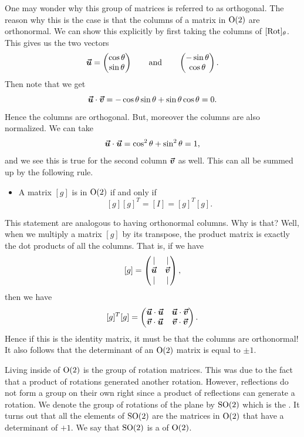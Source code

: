             One may wonder why this group of matrices is referred to as orthogonal.  The reason why this is the case is that the columns of a matrix in $\mathrm{O}(2)$ are orthonormal.  We can show this explicitly by first taking the columns of $[\mathrm{Rot}]_{\theta}$. This gives us the two vectors
            \[
            \boldsymbol{\boldsymbol{\vec{u}}} = \begin{pmatrix} \cos \theta \\ \sin \theta \end{pmatrix} \qquad \textrm{and} \qquad \begin{pmatrix} -\sin \theta \\ \cos \theta \end{pmatrix}.
            \]
            Then note that we get
            \[
            \boldsymbol{\boldsymbol{\vec{u}}} \cdot \boldsymbol{\boldsymbol{\vec{v}}} = -\cos \theta \sin \theta + \sin \theta \cos \theta = 0.
            \]
            Hence the columns are orthogonal.  But, moreover the columns are also normalized. We can take
            \[
            \boldsymbol{\boldsymbol{\vec{u}}} \cdot \boldsymbol{\boldsymbol{\vec{u}}} = \cos^2\theta + \sin^2\theta = 1,
            \]
            and we see this is true for the second column $\boldsymbol{\boldsymbol{\vec{v}}}$ as well.  This can all be summed up by the following rule.
            \begin{itemize}
                \item A matrix $[g]$ is in $\mathrm{O}(2)$ if and only if
                \[
                [g][g]^{T} = [I]=[g]^T [g].
                \]
            \end{itemize}
            This statement are analogous to having orthonormal columns. Why is that? Well, when we multiply a matrix $[g]$ by its transpose, the product matrix is exactly the dot products of all the columns. That is, if we have
            \[
            [g] = \begin{pmatrix} \vert & \vert \\ \boldsymbol{\boldsymbol{\vec{u}}} & \boldsymbol{\boldsymbol{\vec{v}}} \\ \vert & \vert \end{pmatrix},
            \]
            then we have
            \[
            [g]^T[g] = \begin{pmatrix} \boldsymbol{\boldsymbol{\vec{u}}} \cdot \boldsymbol{\boldsymbol{\vec{u}}} & \boldsymbol{\boldsymbol{\vec{u}}} \cdot \boldsymbol{\boldsymbol{\vec{v}}} \\ \boldsymbol{\boldsymbol{\vec{v}}} \cdot \boldsymbol{\boldsymbol{\vec{u}}} & \boldsymbol{\boldsymbol{\vec{v}}} \cdot \boldsymbol{\boldsymbol{\vec{v}}} \end{pmatrix}.
            \]
            Hence if this is the identity matrix, it must be that the columns are orthonormal! It also follows that the determinant of an $\mathrm{O}(2)$ matrix is equal to $\pm 1$.
            
            Living inside of $\mathrm{O}(2)$ is the group of rotation matrices. This was due to the fact that a product of rotations generated another rotation. However, reflections do not form a group on their own right since a product of reflections can generate a rotation.  We denote the group of rotations of the plane by $\mathrm{SO}(2)$ which is the .  It turns out that all the elements of $\mathrm{SO}(2)$ are the matrices in $\mathrm{O}(2)$ that have a determinant of $+1$.  We say that $\mathrm{SO}(2)$ is a  of $\mathrm{O}(2)$.
            
